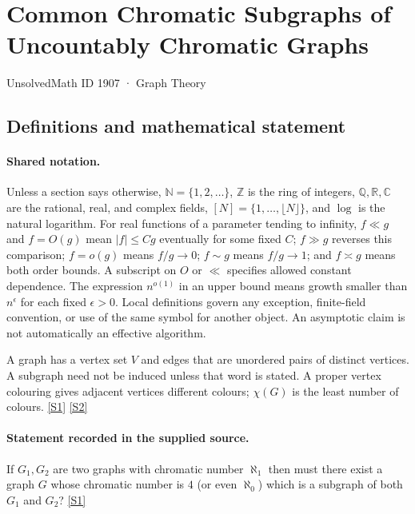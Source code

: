 \documentclass[11pt,a4paper]{article}
\newcommand{\N}{\mathbb{N}}
\newcommand{\Z}{\mathbb{Z}}
\newcommand{\Q}{\mathbb{Q}}
\newcommand{\R}{\mathbb{R}}
\newcommand{\C}{\mathbb{C}}
\newcommand{\sref}[2]{\hyperlink{source:#1:#2}{[S#2]}}
\begin{document}

\setcounter{section}{1906}

\section{Common Chromatic Subgraphs of Uncountably Chromatic Graphs}\label{1907}

{\small\sffamily UnsolvedMath ID 1907 · Graph Theory}

\subsection{Definitions and mathematical statement}

\paragraph{Shared notation.}Unless a section says otherwise, $\N=\{1,2,\ldots\}$,
$\Z$ is the ring of integers, $\Q,\R,\C$ are the rational, real, and complex
fields, $[N]=\{1,\ldots,\lfloor N\rfloor\}$, and $\log$ is the natural
logarithm. For real functions of a parameter tending to infinity,
$f\ll g$ and $f=O(g)$ mean $|f|\leq Cg$ eventually for some fixed $C$;
$f\gg g$ reverses this comparison; $f=o(g)$ means $f/g\to0$;
$f\sim g$ means $f/g\to1$; and $f\asymp g$ means both order bounds.
A subscript on $O$ or $\ll$ specifies allowed constant dependence.
The expression $n^{o(1)}$ in an upper bound means growth smaller than
$n^\epsilon$ for each fixed $\epsilon>0$. Local definitions govern any
exception, finite-field convention, or use of the same symbol for another
object. An asymptotic claim is not automatically an effective algorithm.



A graph has a vertex set $V$ and edges that are unordered pairs of distinct vertices. A subgraph need not be induced unless that word is stated. A proper vertex colouring gives adjacent vertices different colours; $\chi(G)$ is the least number of colours. \sref{1907}{1} \sref{1907}{2}

\paragraph{Statement recorded in the supplied source.}
If $G_1,G_2$ are two graphs with chromatic number $\aleph_1$ then must there exist a graph $G$ whose chromatic number is $4$ (or even $\aleph_0$) which is a subgraph of both $G_1$ and $G_2$? \sref{1907}{1}
\end{document}
